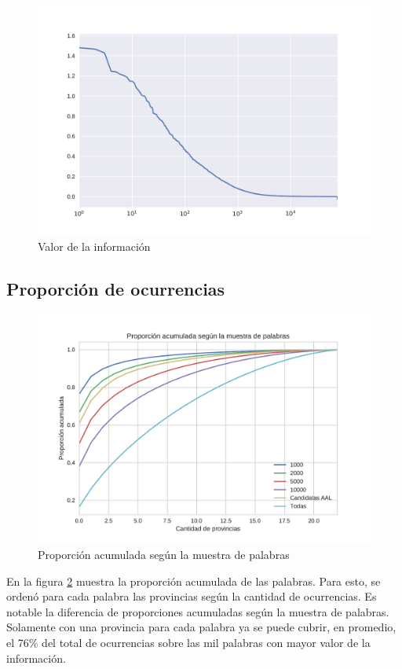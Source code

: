 \begin{figure}[!h]
\centering
\includegraphics[width=1.0\textwidth]{./images/ivaluesLog.pdf}
\caption{Valor de la información} 
\label{fig:ivalue} 
\end{figure}


\subsection{Proporción de ocurrencias} %
\label{sub:proporcionDeOcurrencias}

\begin{figure}[!h]
\centering
\includegraphics[width=1.0\textwidth]{./images/PropAcum.pdf}
\caption{Proporción acumulada según la muestra de palabras} 
\label{fig:propAcum} 
\end{figure}
En la figura \ref{fig:propAcum} muestra la proporción acumulada de las palabras. Para esto, se ordenó para cada palabra las provincias según la cantidad de ocurrencias. Es notable la diferencia de proporciones acumuladas según la muestra de palabras. Solamente con una provincia para cada palabra ya se puede cubrir, en promedio, el 76\% del total de ocurrencias sobre las mil palabras con mayor valor de la información.

